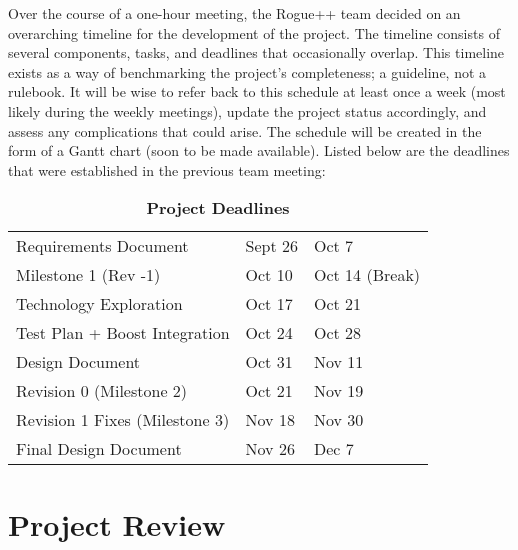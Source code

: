 \documentclass{article}
\begin{document}
\indent
Over the course of a one-hour meeting, the Rogue++ team decided on an overarching timeline for the development of the project.  The timeline consists of several components, tasks, and deadlines that occasionally overlap.  This timeline exists as a way of benchmarking the project's completeness; a guideline, not a rulebook.  It will be wise to refer back to this schedule at least once a week (most likely during the weekly meetings), update the project status accordingly, and assess any complications that could arise.  The schedule will be created in the form of a Gantt chart (soon to be made available).  Listed below are the deadlines that were established in the previous team meeting:

\bigskip

\begin{table}[h!]
	\centering
	\caption{\textbf{Project Deadlines}}
	\bigskip
	\begin{tabular}{lll}
		Requirements Document				&	Sept 26	&	Oct 7\\
		Milestone 1	(Rev -1)				&	Oct 10	&	Oct 14 (Break)\\
		Technology Exploration				&	Oct 17	&	Oct 21\\
		Test Plan + Boost Integration 		&	Oct 24	&	Oct 28\\
		Design Document						&	Oct 31	&	Nov 11\\
		Revision 0 (Milestone 2)			&	Oct 21	&	Nov 19\\
		Revision 1 Fixes (Milestone 3)		&	Nov 18	&	Nov 30\\
		Final Design Document				&	Nov 26	&	Dec 7
	\end{tabular}
\end{table}

\section{Project Review}
\end{document}
